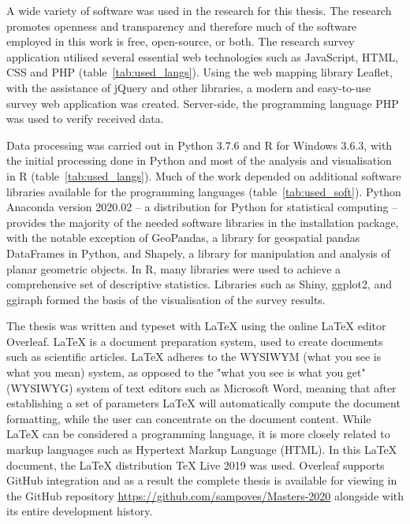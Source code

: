 A wide variety of software was used in the research for this thesis. The research promotes openness and transparency and therefore much of the software employed in this work is free, open-source, or both. The research survey application utilised several essential web technologies such as JavaScript, HTML, CSS and PHP (table~\ref{tab:used_langs}). Using the web mapping library Leaflet, with the assistance of jQuery and other libraries, a modern and easy-to-use survey web application was created. Server-side, the programming language PHP was used to verify received data.

Data processing was carried out in Python 3.7.6 and R for Windows 3.6.3, with the initial processing done in Python and most of the analysis and visualisation in R (table~\ref{tab:used_langs}). Much of the work depended on additional software libraries available for the programming languages (table~\ref{tab:used_soft}). Python Anaconda version 2020.02 -- a distribution for Python for statistical computing -- provides the majority of the needed software libraries in the installation package, with the notable exception of GeoPandas, a library for geospatial pandas DataFrames in Python, and Shapely, a library for manipulation and analysis of planar geometric objects. In R, many libraries were used to achieve a comprehensive set of descriptive statistics. Libraries such as Shiny, ggplot2, and ggiraph formed the basis of the visualisation of the survey results.

The thesis was written and typeset with LaTeX using the online LaTeX editor Overleaf. LaTeX is a document preparation system, used to create documents such as scientific articles. LaTeX adheres to the WYSIWYM (what you see is what you mean) system, as opposed to the "what you see is what you get" (WYSIWYG) system of text editors such as Microsoft Word, meaning that after establishing a set of parameters LaTeX will automatically compute the document formatting, while the user can concentrate on the document content. While LaTeX can be considered a programming language, it is more closely related to markup languages such as Hypertext Markup Language (HTML). In this LaTeX document, the LaTeX distribution TeX Live 2019 was used. Overleaf supports GitHub integration and as a result the complete thesis is available for viewing in the GitHub repository \textcolor{blue}{\url{https://github.com/sampoves/Masters-2020}} alongside with its entire development history.

